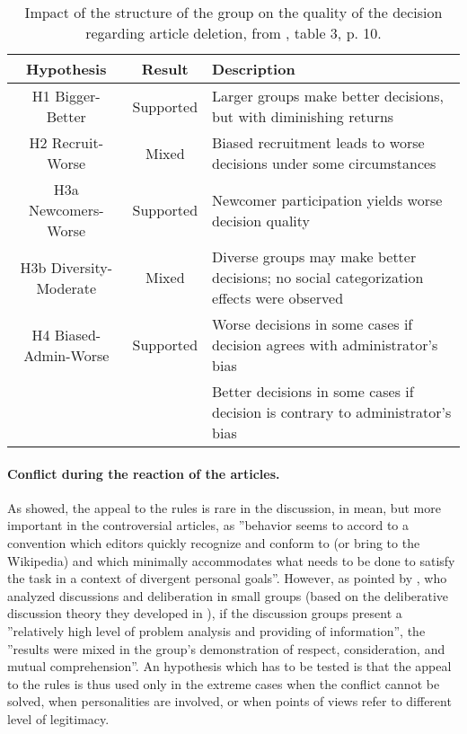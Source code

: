 \begin{table}
\caption{\label{tab:Impact-of-structure-group}Impact of the structure of the
group on the quality of the decision regarding article deletion, from
\citet{LamKarimRiedl10}, table 3, p. 10.}

\begin{tabular}{|c|c|>{\centering}p{8cm}|}
\hline 
Hypothesis & Result & Description\tabularnewline
\hline 
\hline 
H1 Bigger-Better & Supported & Larger groups make better decisions, but with diminishing returns\tabularnewline
\hline 
H2 Recruit-Worse & Mixed & Biased recruitment leads to worse decisions under some circumstances\tabularnewline
\hline 
H3a Newcomers-Worse & Supported & Newcomer participation yields worse decision quality\tabularnewline
\hline 
H3b Diversity-Moderate & Mixed  & Diverse groups may make better decisions; no social categorization
effects were observed\tabularnewline
\hline 
H4 Biased-Admin-Worse  & Supported & Worse decisions in some cases if decision agrees with administrator\textquoteright s
bias\tabularnewline
 &  & Better decisions in some cases if decision is contrary to administrator\textquoteright s
bias\tabularnewline
\hline 
\end{tabular}
\end{table}

\paragraph{Conflict during the reaction of the articles.}

As \citet{GoldspinkEdmondsGilbert10} showed, the appeal to the rules
is rare in the discussion, in mean, but more important in the controversial
articles, as ''behavior seems to accord to a convention which editors
quickly recognize and conform to (or bring to the Wikipedia) and which
minimally accommodates what needs to be done to satisfy the task in
a context of divergent personal goals''. However, as pointed by \citet{Blacketal11},
who analyzed discussions and deliberation in small groups (based on
the deliberative discussion theory they developed in \citet{GastilBlack08}),
if the discussion groups present a ''relatively high level of problem
analysis and providing of information'', the ''results were mixed
in the group's demonstration of respect, consideration, and mutual
comprehension''. An hypothesis which has to be tested is that the
appeal to the rules is thus used only in the extreme cases when the
conflict cannot be solved, when personalities are involved, or when
points of views refer to different level of legitimacy.

